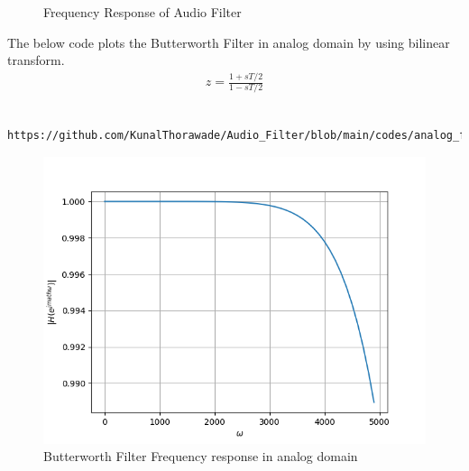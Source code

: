 \documentclass[journal,12pt,twocolumn]{IEEEtran}
\theoremstyle{remark}
\begin{document}
\begin{enumerate}[label=\thesection.\arabic*]
\begin{figure}[H]
					\caption{Frequency Response of Audio Filter}
					\label{fig:H(w)_6}
				\end{figure}
				The below code plots the Butterworth Filter in analog domain by using bilinear transform.
				\begin{align}
					    z=\frac{1+sT/2}{1-sT/2}
				\end{align}
				\begin{lstlisting}
				https://github.com/KunalThorawade/Audio_Filter/blob/main/codes/analog_filt.py
				\end{lstlisting}
				\begin{figure}[H]
					\centering
					\includegraphics[width=1\columnwidth]{figs/Butterworth_analog.png}
					\caption{Butterworth Filter Frequency response in analog domain}
					\label{fig:H(w)_6}
				\end{figure}




\end{enumerate}
\end{document}
